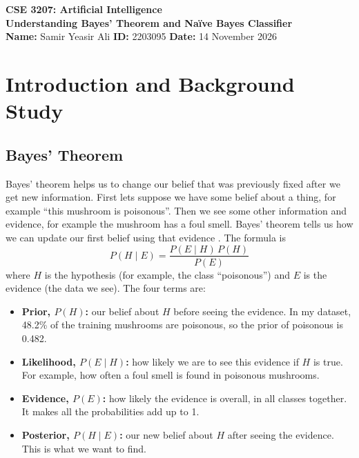 \documentclass[12pt,a4paper]{article}
\begin{document}
\begin{center}
{\large\bfseries CSE 3207: Artificial Intelligence}\\[1pt]
{\Large\bfseries Understanding Bayes' Theorem and Na\"ive Bayes Classifier}\\[1pt]
{\normalsize\textbf{Name:} Samir Yeasir Ali \quad \textbf{ID:} 2203095 \quad \textbf{Date:} 14 November 2026}
\end{center}

\section{Introduction and Background Study}

\subsection{Bayes' Theorem}
Bayes' theorem helps us to change our belief that was previously fixed after we get new information. First lets suppose we have some belief about a thing, for example ``this mushroom is poisonous''. Then we see some other information and evidence, for example the mushroom has a foul smell. Bayes' theorem tells us how we can update our first belief using that evidence \cite{russell2021}. The formula is
\begin{equation}
P(H \mid E) = \frac{P(E \mid H)\, P(H)}{P(E)}
\end{equation}
where $H$ is the hypothesis (for example, the class ``poisonous'') and $E$ is the evidence (the data we see). The four terms are:
\begin{itemize}
  \item \textbf{Prior, $P(H)$:} our belief about $H$ before seeing the evidence. In my dataset, 48.2\% of the training mushrooms are poisonous, so the prior of poisonous is 0.482.
  \item \textbf{Likelihood, $P(E \mid H)$:} how likely we are to see this evidence if $H$ is true. For example, how often a foul smell is found in poisonous mushrooms.
  \item \textbf{Evidence, $P(E)$:} how likely the evidence is overall, in all classes together. It makes all the probabilities add up to 1.
  \item \textbf{Posterior, $P(H \mid E)$:} our new belief about $H$ after seeing the evidence. This is what we want to find.
\end{itemize}
\end{document}
